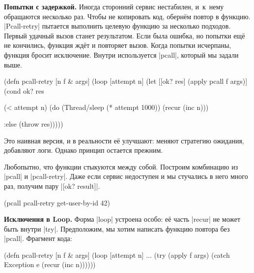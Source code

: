 
\textbf{Попытки с задержкой.} Иногда сторонний сервис нестабилен, и~к~нему
обращаются несколько раз. Чтобы не копировать код, оберн\"{е}м повтор в
функцию. \spverb|Pcall-retry| пытается выполнить целевую функцию за несколько
подходов. Первый удачный вызов станет результатом. Если была ошибка, но попытки
ещ\"{е} не кончились, функция жд\"{е}т и повторяет вызов. Когда попытки
исчерпаны, функция бросит исключение. Внутри используется \spverb|pcall|,
который мы задали выше.


\begin{english}
  \begin{clojure}
(defn pcall-retry [n f & args]
  (loop [attempt n]
    (let [[ok? res] (apply pcall f args)]
      (cond
        ok? res

        (< attempt n)
        (do (Thread/sleep (* attempt 1000))
            (recur (inc n)))

        :else (throw res)))))
  \end{clojure}
\end{english}

Это наивная версия, и в реальности е\"{е} улучшают: меняют стратегию ожидания,
добавляют логи. Однако принцип остается прежним.

Любопытно, что функции стыкуются между собой. Построим комбинацию из
\spverb|pcall| и \spverb|pcall-retry|. Даже если сервис недоступен и мы
стучались в него много раз, получим пару \spverb|[ok? result]|.

\begin{english}
  \begin{clojure}
(pcall pcall-retry get-user-by-id 42)
  \end{clojure}
\end{english}

\textbf{Исключения в Loop.} Форма \spverb|loop| устроена особо: е\"{е} часть
\spverb|recur| не может быть внутри \spverb|try|. Предположим, мы хотим написать
функцию повтора без \spverb|pcall|. Фрагмент кода:


\begin{english}
  \begin{clojure}
(defn pcall-retry [n f & args]
  (loop [attempt n]
    ...
    (try
      (apply f args)
      (catch Exception e
        (recur (inc n))))))
  \end{clojure}
\end{english}

